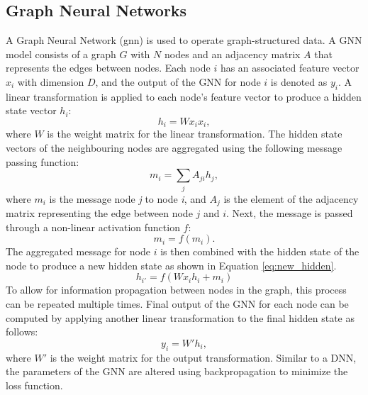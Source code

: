 \subsection{Graph Neural Networks}
A Graph Neural Network (\acrshort{gnn}) is used to operate graph-structured data. A GNN model consists of a graph $G$ with $N$ nodes and an adjacency matrix $A$ that represents the edges between nodes. Each node $i$ has an associated feature vector $x_{i}$ with dimension $D$, and the output of the GNN for node $i$ is denoted as $y_{i}$. A linear transformation is applied to each node's feature vector to produce a hidden state vector $h_{i}$:
%
\begin{equation*}
    h_{i} = Wx_{i}x_{i},\tag{6}
\end{equation*}
%
where $W$ is the weight matrix for the linear transformation. The hidden state vectors of the neighbouring nodes are aggregated using the following message passing function:
%
\begin{equation*}
    m_{i} = {\sum \limits _{j}} A_{ji}h_{j},\tag{7}
\end{equation*}
%
where $m_{i}$ is the message node \textit{j} to node \textit{i}, and $A_{j}$ is the element of the adjacency matrix representing the edge between node $j$ and $i$. Next, the message is passed through a non-linear activation function $f$:
%
\begin{equation*}
    m_{i} = f(m_{i}).\tag{8}
\end{equation*}
%
The aggregated message for node $i$ is then combined with the hidden state of the node to produce a new hidden state as shown in Equation \ref{eq:new_hidden}.
%
\begin{equation*}
    \label{eq:new_hidden}
    h_{i'} = f(Wx_{i}h_{i} + m_{i}) \tag{9}
\end{equation*}
%
To allow for information propagation between nodes in the graph, this process can be repeated multiple times. Final output of the GNN for each node can be computed by applying another linear transformation to the final hidden state as follows:
%
\begin{equation*}
    y_{i} = W'h_{i},\tag{10}
\end{equation*}
%
where $W'$ is the weight matrix for the output transformation. Similar to a DNN, the parameters of the GNN are altered using backpropagation to minimize the loss function.


